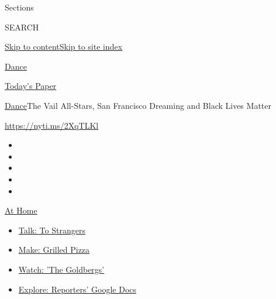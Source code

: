 Sections

SEARCH

\protect\hyperlink{site-content}{Skip to
content}\protect\hyperlink{site-index}{Skip to site index}

\href{https://www.nytimes3xbfgragh.onion/section/arts/dance}{Dance}

\href{https://myaccount.nytimes3xbfgragh.onion/auth/login?response_type=cookie\&client_id=vi}{}

\href{https://www.nytimes3xbfgragh.onion/section/todayspaper}{Today's
Paper}

\href{/section/arts/dance}{Dance}\textbar{}The Vail All-Stars, San
Francisco Dreaming and Black Lives Matter

\url{https://nyti.ms/2XqTLKl}

\begin{itemize}
\item
\item
\item
\item
\item
\end{itemize}

\href{https://www.nytimes3xbfgragh.onion/spotlight/at-home?action=click\&pgtype=Article\&state=default\&region=TOP_BANNER\&context=at_home_menu}{At
Home}

\begin{itemize}
\tightlist
\item
  \href{https://www.nytimes3xbfgragh.onion/2020/08/03/well/family/the-benefits-of-talking-to-strangers.html?action=click\&pgtype=Article\&state=default\&region=TOP_BANNER\&context=at_home_menu}{Talk:
  To Strangers}
\item
  \href{https://www.nytimes3xbfgragh.onion/2020/08/01/at-home/coronavirus-make-pizza-on-a-grill.html?action=click\&pgtype=Article\&state=default\&region=TOP_BANNER\&context=at_home_menu}{Make:
  Grilled Pizza}
\item
  \href{https://www.nytimes3xbfgragh.onion/2020/07/31/arts/television/goldbergs-abc-stream.html?action=click\&pgtype=Article\&state=default\&region=TOP_BANNER\&context=at_home_menu}{Watch:
  'The Goldbergs'}
\item
  \href{https://www.nytimes3xbfgragh.onion/interactive/2020/at-home/even-more-reporters-editors-diaries-lists-recommendations.html?action=click\&pgtype=Article\&state=default\&region=TOP_BANNER\&context=at_home_menu}{Explore:
  Reporters' Google Docs}
\end{itemize}

